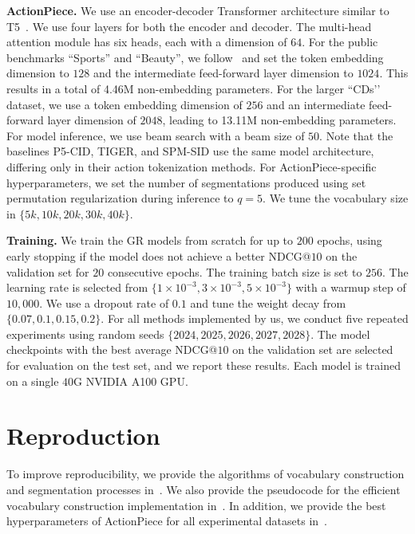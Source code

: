 \textbf{ActionPiece.} We use an encoder-decoder Transformer architecture similar to T5~\cite{raffel2020t5}. We use four layers for both the encoder and decoder. The multi-head attention module has six heads, each with a dimension of $64$. For the public benchmarks ``Sports'' and ``Beauty'', we follow~\citet{rajput2023tiger} and set the token embedding dimension to $128$ and the intermediate feed-forward layer dimension to $1024$. This results in a total of 4.46M non-embedding parameters. For the larger ``CDs’’ dataset, we use a token embedding dimension of $256$ and an intermediate feed-forward layer dimension of $2048$, leading to 13.11M non-embedding parameters. For model inference, we use beam search with a beam size of $50$. Note that the baselines P5-CID, TIGER, and SPM-SID use the same model architecture, differing only in their action tokenization methods. For ActionPiece-specific hyperparameters, we set the number of segmentations produced using set permutation regularization during inference to $q = 5$. We tune the vocabulary size in $\{5k, 10k, 20k, 30k, 40k\}$.

\textbf{Training.} We train the GR models from scratch for up to $200$ epochs, using early stopping if the model does not achieve a better NDCG@$10$ on the validation set for $20$ consecutive epochs. The training batch size is set to $256$. The learning rate is selected from $\{1\times 10^{-3}, 3\times 10^{-3}, 5\times 10^{-3}\}$ with a warmup step of $10{,}000$. We use a dropout rate of $0.1$ and tune the weight decay from $\{0.07, 0.1, 0.15, 0.2\}$. For all methods implemented by us, we conduct five repeated experiments using random seeds $\{2024, 2025, 2026, 2027, 2028\}$. The model checkpoints with the best average NDCG@$10$ on the validation set are selected for evaluation on the test set, and we report these results. Each model is trained on a single $40$G NVIDIA A100 GPU.


\section{Reproduction}

To improve reproducibility, we provide the algorithms of vocabulary construction and segmentation processes in~. We also provide the pseudocode for the efficient vocabulary construction implementation in~. In addition, we provide the best hyperparameters of ActionPiece for all experimental datasets in~.




